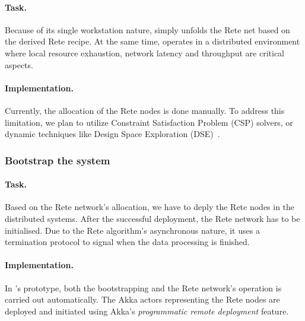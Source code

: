 \paragraph{Task.} Because of its single workstation nature, \eiq{} simply unfolds the Rete net based on the derived Rete recipe. At the same time, \iqd{} operates in a distributed environment where local resource exhaustion, network latency and throughput are critical aspects. 

\paragraph{Implementation.} Currently, the allocation of the Rete nodes is done manually. To address this limitation, we plan to utilize Constraint Satisfaction Problem (CSP) solvers, or dynamic techniques like Design Space Exploration (DSE)~\cite{DSE11}. 

\subsubsection{Bootstrap the system}

\paragraph{Task.} Based on the Rete network's allocation, we have to deply the Rete nodes in the distributed systems. After the successful deployment, the Rete network has to be initialised. Due to the Rete algorithm's asynchronous nature, it uses a termination protocol to signal when the data processing is finished. 

\paragraph{Implementation.} In \iqd{}'s prototype, both the bootstrapping and the Rete network's operation is carried out automatically. The Akka actors representing the Rete nodes are deployed and initiated using Akka's \textit{programmatic remote deployment} feature. 


